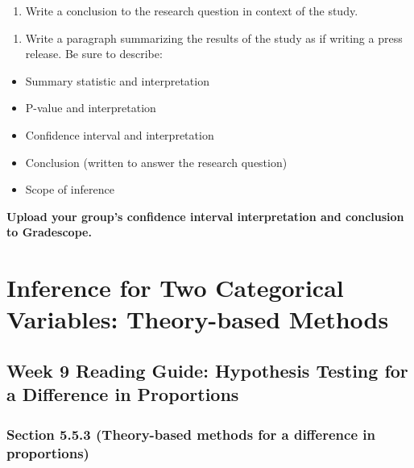 \documentclass[
]{report}
\providecommand{\tightlist}{%
  \setlength{\itemsep}{0pt}\setlength{\parskip}{0pt}}
\begin{document}
\begin{enumerate}
\def\labelenumi{\arabic{enumi}.}
\setcounter{enumi}{10}
\tightlist
\item
  Write a conclusion to the research question in context of the study.
\end{enumerate}

\vspace{0.8in}

\begin{enumerate}
\def\labelenumi{\arabic{enumi}.}
\setcounter{enumi}{11}
\tightlist
\item
  Write a paragraph summarizing the results of the study as if writing a press release. Be sure to describe:
\end{enumerate}

\begin{itemize}
\item
  Summary statistic and interpretation
\item
  P-value and interpretation
\item
  Confidence interval and interpretation
\item
  Conclusion (written to answer the research question)
\item
  Scope of inference
\end{itemize}

\textbf{Upload your group's confidence interval interpretation and conclusion to Gradescope.}

\newpage

\hypertarget{inference-for-two-categorical-variables-theory-based-methods}{%
\chapter{Inference for Two Categorical Variables: Theory-based Methods}\label{inference-for-two-categorical-variables-theory-based-methods}}

\hypertarget{week-9-reading-guide-hypothesis-testing-for-a-difference-in-proportions}{%
\section{Week 9 Reading Guide: Hypothesis Testing for a Difference in Proportions}\label{week-9-reading-guide-hypothesis-testing-for-a-difference-in-proportions}}

\hypertarget{section-5.5.3-theory-based-methods-for-a-difference-in-proportions}{%
\subsection*{Section 5.5.3 (Theory-based methods for a difference in proportions)}\label{section-5.5.3-theory-based-methods-for-a-difference-in-proportions}}
\end{document}

